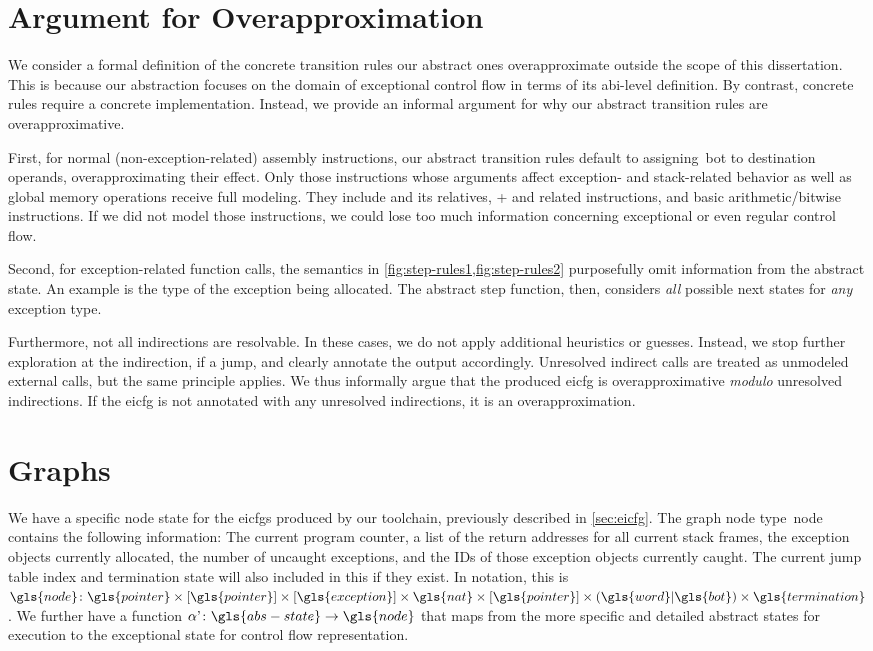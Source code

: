 \section{Argument for Overapproximation}
We consider a formal definition of the concrete transition rules our abstract ones overapproximate outside the scope of this dissertation.
This is because our abstraction focuses on the domain of exceptional control flow in terms of its \gls{abi}-level definition. By contrast, concrete rules require a concrete implementation.
Instead, we provide an informal argument for why our abstract transition rules are overapproximative.

First, for normal (non-exception-related) assembly instructions, our abstract transition rules default to assigning~\gls{bot} to destination operands, overapproximating their effect.
Only those instructions whose arguments affect exception- and stack-related behavior as well as global memory operations receive full modeling.
They include  and its relatives, + and related instructions, and basic arithmetic/bitwise instructions.
If we did not model those instructions, we could lose too much information concerning exceptional or even regular control flow.

Second, for exception-related function calls, the semantics in \cref{fig:step-rules1,fig:step-rules2} purposefully omit information from the abstract state.
An example is the type of the exception being allocated.
The abstract step function, then, considers \emph{all} possible next states for \emph{any} exception type.

Furthermore, not all indirections are resolvable.
In these cases, we do not apply additional heuristics or guesses.
Instead, we stop further exploration at the indirection, if a jump, and clearly annotate the output accordingly.
Unresolved indirect calls are treated as unmodeled external calls, but the same principle applies.
We thus informally argue that the produced \gls{eicfg} is overapproximative \emph{modulo} unresolved indirections.
If the \gls{eicfg} is not annotated with any unresolved indirections, it is an overapproximation.

\section{Graphs}
We have a specific node state for the \glspl{eicfg} produced by our toolchain,
previously described in \cref{sec:eicfg}.
The graph node type~\gls{node} contains the following information:
The current program counter,
a list of the return addresses for all current stack frames,
the exception objects currently allocated,
the number of uncaught exceptions,
and the IDs of those exception objects currently caught.
The current jump table index and termination state will also included in this if they exist. In notation, this is
$\gls{node}\colon\gls{pointer}\times[\gls{pointer}]\times[\gls{exception}]\times\gls{nat}\times[\gls{pointer}]\times(\gls{word}|\gls{bot})\times\gls{termination}$.
We further have a function $\stateToNode\colon\gls{abs-state}\rightarrow\gls{node}$
that maps from the more specific and detailed abstract states for execution
to the exceptional state for control flow representation.

